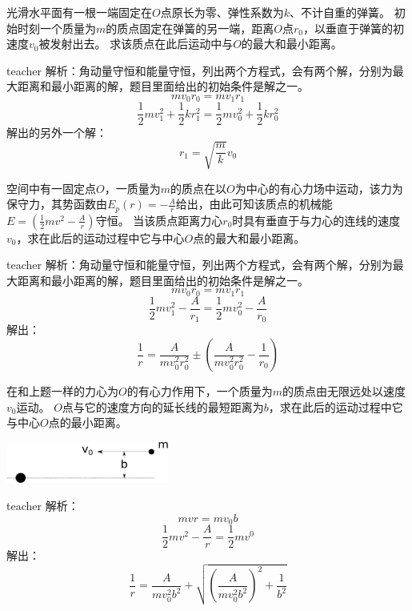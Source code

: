 \begin{example}
光滑水平面有一根一端固定在$O$点原长为零、弹性系数为$k$、不计自重的弹簧。
初始时刻一个质量为$m$的质点固定在弹簧的另一端，距离$O$点$r_0$，以垂直于弹簧的初速度$v_0$被发射出去。
求该质点在此后运动中与$O$的最大和最小距离。
\begin{taggedblock}{teacher}
\newline
解析：角动量守恒和能量守恒，列出两个方程式，会有两个解，分别为最大距离和最小距离的解，题目里面给出的初始条件是解之一。
\[mv_0r_0=mv_1r_1\]
\[\frac{1}{2}mv_1^2+\frac{1}{2}kr_1^2=\frac{1}{2}mv_0^2+\frac{1}{2}kr_0^2\]
解出的另外一个解：\[r_1=\sqrt{\frac{m}{k}}v_0\]
\end{taggedblock}
\end{example}

\begin{example}
空间中有一固定点$O$，一质量为$m$的质点在以$O$为中心的有心力场中运动，该力为保守力，其势函数由$E_p(r)=-\frac{A}{r}$给出，由此可知该质点的机械能$E=(\frac{1}{2}mv^2-\frac{A}{r})$守恒。
当该质点距离力心$r_0$时具有垂直于与力心的连线的速度$v_0$，求在此后的运动过程中它与中心$O$点的最大和最小距离。
\begin{taggedblock}{teacher}
\newline
解析：角动量守恒和能量守恒，列出两个方程式，会有两个解，分别为最大距离和最小距离的解，题目里面给出的初始条件是解之一。
\[mv_0r_0=mv_1r_1\]
\[\frac{1}{2}mv_1^2-\frac{A}{r_1}=\frac{1}{2}mv_0^2-\frac{A}{r_0}\]
解出：\[\frac{1}{r}=\frac{A}{mv_0^2r_0^2}\pm(\frac{A}{mv_0^2r_0^2}-\frac{1}{r_0})\]
\end{taggedblock}
\end{example}


\begin{example}
在和上题一样的力心为$O$的有心力作用下，一个质量为$m$的质点由无限远处以速度$v_0$运动。
$O$点与它的速度方向的延长线的最短距离为$b$，求在此后的运动过程中它与中心$O$点的最小距离。
	\begin{flushright}
		\includegraphics[width = 0.4\textwidth]{images/ang-momontum-4.pdf} 
	\end{flushright}
\begin{taggedblock}{teacher}
\noindent
解析：\[mvr=mv_0b\]
\[\frac{1}{2}mv^2-\frac{A}{r}=\frac{1}{2}mv^0\]
解出：\[\frac{1}{r}=\frac{A}{mv_0^2b^2}+\sqrt{(\frac{A}{mv_0^2b^2})^2+\frac{1}{b^2}}\]
\end{taggedblock}
\end{example}

